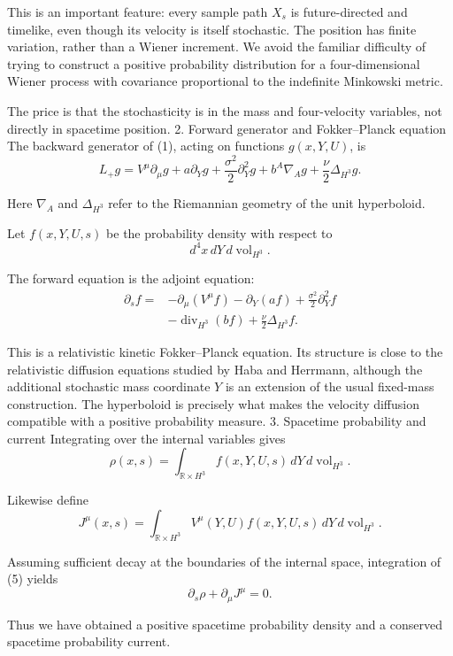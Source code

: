 This is an important feature: every sample path \(X_s\) is future-directed and timelike, even though its velocity is itself stochastic. The position has finite variation, rather than a Wiener increment. We avoid the familiar difficulty of trying to construct a positive probability distribution for a four-dimensional Wiener process with covariance proportional to the indefinite Minkowski metric.

The price is that the stochasticity is in the mass and four-velocity variables, not directly in spacetime position.
2. Forward generator and Fokker–Planck equation
The backward generator of (1), acting on functions \(g(x,Y,U)\), is
\[
L_+g
=
V^\mu\partial_\mu g
+a\partial_Yg
+\frac{\sigma^2}{2}\partial_Y^2g
+b^A\nabla_Ag
+\frac{\nu}{2}\Delta_{H^3}g.
\tag{4}
\]

Here \(\nabla_A\) and \(\Delta_{H^3}\) refer to the Riemannian geometry of the unit hyperboloid.

Let \(f(x,Y,U,s)\) be the probability density with respect to
\[
d^4x\,dY\,d\operatorname{vol}_{H^3}.
\]

The forward equation is the adjoint equation:
\[
\begin{aligned}
\partial_s f={}&-\partial_\mu(V^\mu f)
-\partial_Y(af)
+\frac{\sigma^2}{2}\partial_Y^2f\\
&-\operatorname{div}_{H^3}(bf)
+\frac{\nu}{2}\Delta_{H^3}f.
\end{aligned}
\tag{5}
\]

This is a relativistic kinetic Fokker–Planck equation. Its structure is close to the relativistic diffusion equations studied by Haba and Herrmann, although the additional stochastic mass coordinate \(Y\) is an extension of the usual fixed-mass construction. The hyperboloid is precisely what makes the velocity diffusion compatible with a positive probability measure.
3. Spacetime probability and current
Integrating over the internal variables gives
\[
\rho(x,s)=
\int_{\mathbb R\times H^3}f(x,Y,U,s)\,
dY\,d\operatorname{vol}_{H^3}.
\tag{6}
\]

Likewise define
\[
J^\mu(x,s)=
\int_{\mathbb R\times H^3}V^\mu(Y,U)f(x,Y,U,s)\,
dY\,d\operatorname{vol}_{H^3}.
\tag{7}
\]

Assuming sufficient decay at the boundaries of the internal space, integration of (5) yields
\[
\boxed{\partial_s\rho+\partial_\mu J^\mu=0.}
\tag{8}
\]

Thus we have obtained a positive spacetime probability density and a conserved spacetime probability current.

